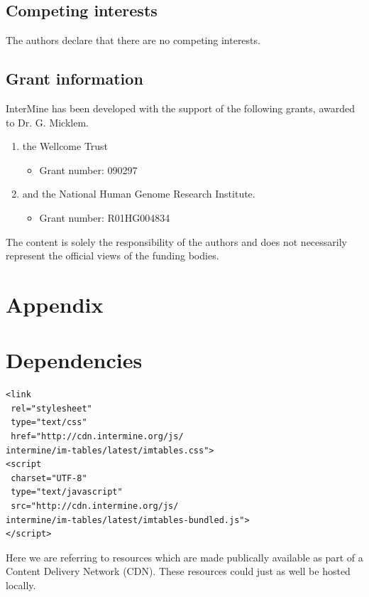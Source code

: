 \documentclass[10pt,a4paper,twocolumn]{article}
\begin{document}
\subsection*{Competing interests}

The authors declare that there are no competing interests.

\subsection*{Grant information}
InterMine has been developed with the support of the following grants, awarded
to Dr. G. Micklem.

\begin{enumerate}
\item the Wellcome Trust
 \begin{itemize}
 \item{Grant number: 090297}
 \end{itemize}
\item and the National Human Genome Research Institute.
 \begin{itemize}
 \item{Grant number: R01HG004834}
 \end{itemize}
\end{enumerate}

The content is solely the responsibility of the authors and does not necessarily
represent the official views of the funding bodies.

\nocite{*}
{\small
}

\section*{Appendix}
\appendix
\section{Dependencies} \label{sec:deps}

\lstset{language=HTML}

\begin{lstlisting}
<link
 rel="stylesheet"
 type="text/css"
 href="http://cdn.intermine.org/js/
intermine/im-tables/latest/imtables.css">
<script
 charset="UTF-8"
 type="text/javascript"
 src="http://cdn.intermine.org/js/
intermine/im-tables/latest/imtables-bundled.js">
</script>
\end{lstlisting}

Here we are referring to resources which are made publically available
as part of a Content Delivery Network (CDN). These resources could just
as well be hosted locally.
\end{document}
